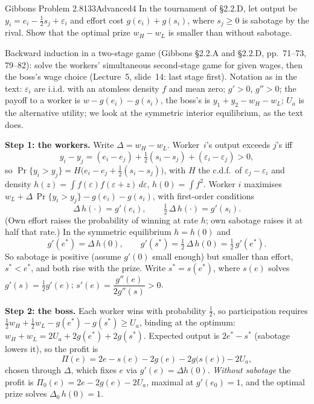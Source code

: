 \begin{exsol}{Gibbons Problem 2.8}{133}{Advanced}{4}
\asked In the tournament of \S2.2.D, let output be $y_i = e_i - \tfrac12 s_j + \varepsilon_i$ and effort cost
$g(e_i) + g(s_i)$, where $s_j \ge 0$ is sabotage by the rival. Show that the optimal prize $w_H - w_L$ is smaller than without sabotage.

\method Backward induction in a two-stage game (Gibbons \S2.2.A and \S2.2.D, pp.~71--73, 79--82): solve the
workers' simultaneous second-stage game for given wages, then the boss's wage choice (Lecture~5, slide~14: last stage
first). Notation as in the text: $\varepsilon_i$ are i.i.d. with an atomless density $f$ and mean zero; $g' > 0$,
$g'' > 0$; the payoff to a worker is $w - g(e_i) - g(s_i)$, the boss's is $y_1 + y_2 - w_H - w_L$; $U_a$ is the
alternative utility; we look at the symmetric interior equilibrium, as the text does.

\solution
\textbf{Step 1: the workers.} Write $\Delta = w_H - w_L$. Worker~$i$'s output exceeds $j$'s iff
\[
  y_i - y_j = (e_i - e_j) + \tfrac12(s_i - s_j) + (\varepsilon_i - \varepsilon_j) > 0 ,
\]
so $\Pr\{y_i > y_j\} = H\bigl(e_i - e_j + \tfrac12(s_i - s_j)\bigr)$, with $H$ the c.d.f.\ of $\varepsilon_j - \varepsilon_i$ and density
$h(z) = \int f(\varepsilon)f(\varepsilon + z)\,d\varepsilon$, $h(0) = \int f^2$. Worker $i$ maximises
$w_L + \Delta\,\Pr\{y_i > y_j\} - g(e_i) - g(s_i)$, with first-order conditions
\[
  \Delta\,h(\cdot) = g'(e_i), \qquad \tfrac12\,\Delta\,h(\cdot) = g'(s_i).
\]
(Own effort raises the probability of winning at rate $h$; own sabotage raises it at half that rate.) In the symmetric equilibrium
$h = h(0)$ and
\[
  g'(e^*) = \Delta\,h(0), \qquad g'(s^*) = \tfrac12\,\Delta\,h(0) = \tfrac12\,g'(e^*) .
\]
So sabotage is positive (assume $g'(0)$ small enough) but smaller than effort, $s^* < e^*$, and both rise with the prize.
Write $s^* = s(e^*)$, where $s(e)$ solves $g'(s) = \tfrac12 g'(e)$; $s'(e) = \dfrac{g''(e)}{2g''(s)} > 0$.

\textbf{Step 2: the boss.} Each worker wins with probability $\frac12$, so participation requires
$\frac12 w_H + \frac12 w_L - g(e^*) - g(s^*) \ge U_a$, binding at the optimum:
$w_H + w_L = 2U_a + 2g(e^*) + 2g(s^*)$. Expected output is $2e^* - s^*$ (sabotage lowers it), so the profit is
\[
  \Pi(e) = 2e - s(e) - 2g(e) - 2g\bigl(s(e)\bigr) - 2U_a ,
\]
chosen through $\Delta$, which fixes $e$ via $g'(e) = \Delta h(0)$. \emph{Without sabotage} the profit is
$\Pi_0(e) = 2e - 2g(e) - 2U_a$, maximal at $g'(e_0) = 1$, and the optimal prize solves $\Delta_0\,h(0) = 1$.


\end{exsol}
